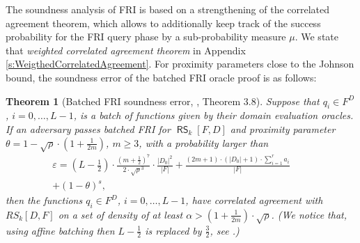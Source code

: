 \documentclass[11pt]{article}
\newtheorem{thm}{Theorem}[]
\newtheorem{prop}[]{Proposition}
\theoremstyle{definition}
\theoremstyle{remark}
\DeclareMathOperator{\RS}{\mathsf{RS}}
\begin{document}
%

The soundness analysis of FRI is based on a strengthening of the correlated agreement theorem, which allows to additionally keep track of the success probability for the FRI query phase by a sub-probability measure $\mu$.
We state that \textit{weighted correlated agreement theorem} in Appendix \ref{s:WeigthedCorrelatedAgreement}.
For proximity parameters close to the Johnson bound, the soundness error of the batched FRI oracle proof is as follows:

\begin{thm}[Batched FRI soundness error, \cite{ProximityGaps}, Theorem 3.8]
\label{thm:BatchedFRISoundness}
Suppose that $q_i\in F^D$, $i=0,\ldots,L-1$, is a batch of functions given by their domain evaluation oracles.
 If an adversary passes batched FRI for $\RS_k[F,D]$ and proximity parameter $\theta =1-\sqrt\rho \cdot \left(1+\frac{1}{2m}\right)$, $m\geq 3$, with a probability larger than
\begin{equation}
\label{e:EpsilonFRI}
\begin{aligned} 
\varepsilon = \left(L-\frac{1}{2}\right) \cdot \frac {\left(m+ \frac{1}{2}\right)^7}{2\cdot\sqrt\rho^3}\cdot \frac{|D_0|^2}{|F|} 
+ \frac{(2m+1)\cdot (|D_0|+1)\cdot \sum_{i=1}^{r} a_i}{|F|} \quad\quad
\\
+(1-\theta)^s ,
\end{aligned}
\end{equation}
 then the functions $q_i\in F^D$, $i=0,\ldots,L-1$, have correlated agreement with $RS_k[D,F]$ on a set of density of at least $\alpha >\left(1+\frac{1}{2m}\right)\cdot \sqrt\rho$.
(We notice that, using affine batching then $L-\frac{1}{2}$ is replaced by $\frac{3}{2}$, see \cite{ProximityGaps}.)
\end{thm}
\end{document}
